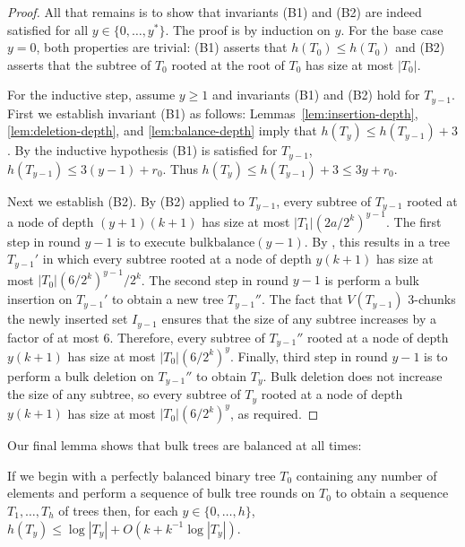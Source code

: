 \documentclass[kpfonts]{patmorin}
\begin{document}
\begin{proof}
  All that remains is to show that invariants (B1) and (B2) are indeed satisfied for all $y\in\{0,\ldots,y^*\}$.  The proof is by induction on $y$.  For the base case $y=0$, both properties are trivial: (B1) asserts that $h(T_0)\le h(T_0)$ and (B2) asserts that the subtree of $T_0$ rooted at the root of $T_0$ has size at most $|T_0|$.

  For the inductive step, assume $y\ge 1$ and invariants (B1) and (B2) hold for $T_{y-1}$.  First we establish invariant (B1) as follows:
  Lemmas~\ref{lem:insertion-depth}, \ref{lem:deletion-depth}, and \ref{lem:balance-depth} imply that $h(T_y)\le h(T_{y-1})+3$.  
  By the inductive hypothesis (B1) is satisfied for $T_{y-1}$, $h(T_{y-1})\le 3(y-1) + r_0$.  Thus $h(T_y)\le h(T_{y-1}) + 3 \le 3y+r_0$.
  
  Next we establish (B2).  By (B2) applied to $T_{y-1}$, every subtree of $T_{y-1}$ rooted at a node of depth $(y+1)(k+1)$ has size at most $|T_{1}|(2a/2^k)^{y-1}$.  The first step in round $y-1$ is to execute $\mathrm{bulkbalance}(y-1)$.  By , this results in a tree $T_{y-1}'$ in which every subtree rooted at a node of depth $y(k+1)$ has size at most $|T_{0}|(6/2^k)^{y-1}/2^k$.  The second step in round $y-1$ is perform a bulk insertion on $T_{y-1}'$ to obtain a new tree $T_{y-1}''$.  The fact that $V(T_{y-1})$ 3-chunks the newly inserted set $I_{y-1}$ ensures that the size of any subtree increases by a factor of at most $6$.  Therefore, every subtree of $T_{y-1}''$ rooted at a node of depth $y(k+1)$ has size at most $|T_{0}|(6/2^k)^{y}$.  Finally, third step in round $y-1$ is to perform a bulk deletion on $T_{y-1}''$ to obtain $T_{y}$.  Bulk deletion does not increase the size of any subtree, so every subtree of $T_{y}$ rooted at a node of depth $y(k+1)$ has size at most $|T_{0}|(6/2^k)^{y}$, as required.
\end{proof}


Our final lemma shows that bulk trees are balanced at all times:
\begin{lem}
  If we begin with a perfectly balanced binary tree $T_0$ containing any number of elements and perform a sequence of bulk tree rounds on $T_0$ to obtain a sequence $T_1,\ldots,T_h$ of trees then, for each $y\in\{0,\ldots,h\}$, $h(T_y)\le \log|T_y| + O(k+k^{-1}\log|T_y|)$.
\end{lem}
\end{document}
